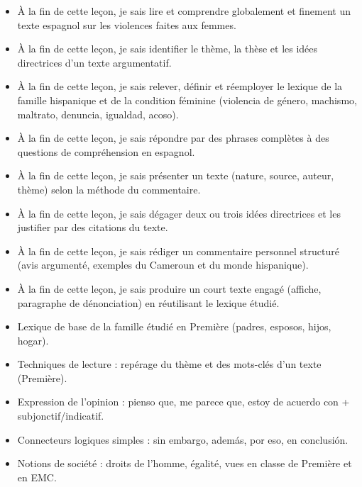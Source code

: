 \documentclass[11pt]{article}
\begin{document}
\begin{objectifs}
\begin{itemize}
\item À la fin de cette leçon, je sais lire et comprendre globalement et finement un texte espagnol sur les violences faites aux femmes.
\item À la fin de cette leçon, je sais identifier le thème, la thèse et les idées directrices d'un texte argumentatif.
\item À la fin de cette leçon, je sais relever, définir et réemployer le lexique de la famille hispanique et de la condition féminine (violencia de género, machismo, maltrato, denuncia, igualdad, acoso).
\item À la fin de cette leçon, je sais répondre par des phrases complètes à des questions de compréhension en espagnol.
\item À la fin de cette leçon, je sais présenter un texte (nature, source, auteur, thème) selon la méthode du commentaire.
\item À la fin de cette leçon, je sais dégager deux ou trois idées directrices et les justifier par des citations du texte.
\item À la fin de cette leçon, je sais rédiger un commentaire personnel structuré (avis argumenté, exemples du Cameroun et du monde hispanique).
\item À la fin de cette leçon, je sais produire un court texte engagé (affiche, paragraphe de dénonciation) en réutilisant le lexique étudié.
\end{itemize}
\end{objectifs}

\begin{prerequis}
\begin{itemize}
\item Lexique de base de la famille étudié en Première (padres, esposos, hijos, hogar).
\item Techniques de lecture : repérage du thème et des mots-clés d'un texte (Première).
\item Expression de l'opinion : pienso que, me parece que, estoy de acuerdo con + subjonctif/indicatif.
\item Connecteurs logiques simples : sin embargo, además, por eso, en conclusión.
\item Notions de société : droits de l'homme, égalité, vues en classe de Première et en EMC.
\end{itemize}
\end{prerequis}
\end{document}
